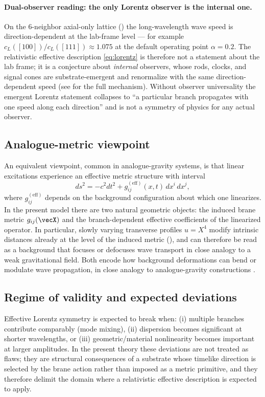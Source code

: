\paragraph{Dual-observer reading: the only Lorentz observer is the internal one.}
On the 6-neighbor axial-only lattice () the long-wavelength wave speed
is direction-dependent at the lab-frame level --- for example $c_L([100])/c_L([111])\approx 1.075$
at the default operating point $\alpha=0.2$.
The relativistic effective description \eqref{eq:lorentz} is therefore not a statement about the lab frame; it is a
conjecture about \emph{internal} observers, whose rods, clocks, and signal cones are substrate-emergent and renormalize
with the same direction-dependent speed (see  for the full mechanism).
Without observer universality the emergent Lorentz statement collapses to ``a particular branch
propagates with one speed along each direction'' and is not a symmetry of physics for any actual observer.

\subsection{Analogue-metric viewpoint}

An equivalent viewpoint, common in analogue-gravity systems, is that linear excitations experience an
effective metric structure with interval
\begin{equation}
  ds^2 = -c^2 dt^2 + g^{(\text{eff})}_{ij}(x,t)\,dx^i\,dx^j,
  \label{eq:effective-metric-interval}
\end{equation}
where $g^{(\text{eff})}_{ij}$ depends on the background configuration about which one linearizes.
In the present model there are two natural geometric objects: the induced brane metric $g_{ij}(\vecX)$
and the branch-dependent effective coefficients of the linearized operator.
In particular, slowly varying transverse profiles $u=X^4$ modify intrinsic distances already at the level of the induced metric (), and can therefore be read as a background that focuses or defocuses wave transport in close analogy to a weak gravitational field.
Both encode how background deformations can bend or modulate wave propagation, in close analogy to
analogue-gravity constructions \citep{Barcelo2011AnalogueGravity,Volovik2003HeliumDroplet}.

\subsection{Regime of validity and expected deviations}

Effective Lorentz symmetry is expected to break when:
(i) multiple branches contribute comparably (mode mixing),
(ii) dispersion becomes significant at shorter wavelengths, or
(iii) geometric/material nonlinearity becomes important at larger amplitudes.
In the present theory these deviations are not treated as flaws; they are structural consequences of a substrate whose timelike direction is selected by the brane action rather than imposed as a metric primitive, and they therefore delimit the domain where a relativistic effective description is expected to apply.

